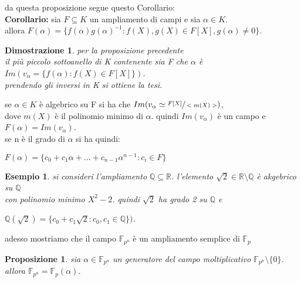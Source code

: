 \documentclass[a4paper,12pt]{article}
\theoremstyle{def}
\theoremstyle{prop}
\newtheorem*{proposition}{Proposizione}
\theoremstyle{esempio}
\newtheorem*{example}{Esempio}
\theoremstyle{dimostrazione}
\newtheorem*{dimostrazione}{Dimostrazione}
\theoremstyle{teo}
\theoremstyle{osservazione}
\begin{document}
da questa proposizione segue questo Corollario:\\

\textbf{Corollario:} sia \(F \subseteq K\) un ampliamento di campi e sia \(\alpha \in K\).\\
allora \(F(\alpha) = \{f(\alpha)g(\alpha)^{-1} : f(X),g(X) \in F[X], g(\alpha) \neq 0\}\).

\begin{dimostrazione}
    per la proposizione precedente\\
    il più piccolo sottoanello di K contenente sia F che \(\alpha\) è \(Im(v_\alpha = \{f(\alpha) : f(X) \in F[X]\})\).\\
    prendendo gli inversi in K si ottiene la tesi.
\end{dimostrazione}

\vspace{\baselineskip}

se \(\alpha \in K\) è algebrico su F si ha che \(Im(v_\alpha \simeq \sfrac{F[X]}{<m(X)>})\),\\
dove \(m(X)\) è il polinomio minimo di \(\alpha\). quindi \(Im(v_\alpha)\) è un campo e \(F(\alpha) = Im(v_\alpha)\).\\
se n è il grado di \(\alpha\) si ha quindi:
\begin{center}
    \(F(\alpha) = \{c_0 + c_1\alpha + ... + c_{n-1}\alpha^{n-1} : c_i \in F\}\)
\end{center}

\begin{example}
    si consideri l'ampliamento \(\mathbb{Q} \subseteq \mathbb{R}\). l'elemento \(\sqrt{2}\in \mathbb{R} \setminus \mathbb{Q}\) è akgebrico su \(\mathbb{Q}\)\\
    con polinomio minimo \(X^2 -2\). quindi \(\sqrt{2}\) ha grado 2 su \(\mathbb{Q}\) e
    \begin{center}
        \(\mathbb{Q}(\sqrt{2}) = \{ c_0 + c_1 \sqrt{2} : c_0,c_1 \in \mathbb{Q}\})\).
    \end{center}
\end{example}

adesso mostriamo che il campo \(\mathbb{F}_{p^n}\) è un ampliamento semplice di \(\mathbb{F}_p\)
\begin{proposition}
    sia \(\alpha \in \mathbb{F}_{p^n}\) un generatore del campo moltiplicativo \(\mathbb{F}_{p^n} \setminus \{0\}\).\\
    allora \(\mathbb{F}_{p^n} = \mathbb{F}_p(\alpha)\).
\end{proposition}
\end{document}
